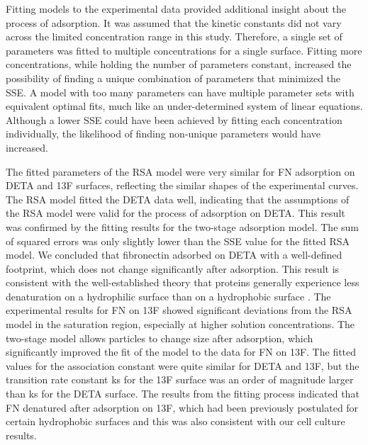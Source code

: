 Fitting models to the experimental data provided additional insight
about the process of adsorption. It was assumed that the kinetic constants
did not vary across the limited concentration range in this study.
Therefore, a single set of parameters was fitted to multiple concentrations
for a single surface. Fitting more concentrations, while holding the
number of parameters constant, increased the possibility of finding
a unique combination of parameters that minimized the SSE. A model
with too many parameters can have multiple parameter sets with equivalent
optimal fits, much like an under-determined system of linear equations.
Although a lower SSE could have been achieved by fitting each concentration
individually, the likelihood of finding non-unique parameters would
have increased. 

The fitted parameters of the RSA model were very similar for FN adsorption
on DETA and 13F surfaces, reflecting the similar shapes of the experimental
curves. The RSA model fitted the DETA data well, indicating that the
assumptions of the RSA model were valid for the process of adsorption
on DETA. This result was confirmed by the fitting results for the
two-stage adsorption model. The sum of squared errors was only slightly
lower than the SSE value for the fitted RSA model. We concluded that
fibronectin adsorbed on DETA with a well-defined footprint, which
does not change significantly after adsorption. This result is consistent
with the well-established theory that proteins generally experience
less denaturation on a hydrophilic surface than on a hydrophobic surface
\cite{Latour2005}. The experimental results for FN on 13F showed
significant deviations from the RSA model in the saturation region,
especially at higher solution concentrations. The two-stage model
allows particles to change size after adsorption, which significantly
improved the fit of the model to the data for FN on 13F. The fitted
values for the association constant were quite similar for DETA and
13F, but the transition rate constant ks for the 13F surface was an
order of magnitude larger than ks for the DETA surface. The results
from the fitting process indicated that FN denatured after adsorption
on 13F, which had been previously postulated for certain hydrophobic
surfaces \cite{Lan2005,Sivaraman2009} and this was also consistent
with our cell culture results. 

